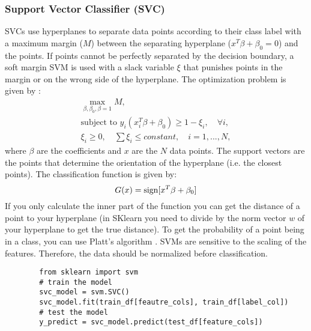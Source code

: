 \documentclass[../main.tex]{subfiles}
\begin{document}
    \subsubsection{Support Vector Classifier (SVC)}
    SVCs use hyperplanes to separate data points according to their class label with a maximum margin ($M$) between the separating hyperplane ($x^T\beta + \beta_0=0$) and the points. If points cannot be perfectly separated by the decision boundary, a soft margin SVM is used with a slack variable $\xi$ that punishes points in the margin or on the wrong side of the hyperplane.
    The optimization problem is given by \cite{Hastie2009} : 
    \begin{equation}
        \begin{split}
            \max_{\beta, \beta_0, \beta=1} M, \\
            \text{subject to } y_i(x_i^T \beta + \beta_0) \ge 1 - \xi_i, \quad \forall i, \\\xi_i \ge 0, \quad \sum \xi_i \le constant, \quad i= 1, ..., N, 
        \end{split}
    \end{equation} 
    where $\beta$ are the coefficients and $x$ are the $N$ data points. The support vectors are the points that determine the orientation of the hyperplane (i.e. the closest points).
    The classification function is given by: 
    \begin{equation}
        G(x) = \operatorname{sign}[x^T\beta + \beta_0] 
    \end{equation}
    If you only calculate the inner part of the function you can get the distance of a point to your hyperplane (in SKlearn you need to divide by the norm vector $w$ of your hyperplane to get the true distance). To get the probability of a point being in a class, you can use Platt's algorithm \cite{Platt1999}. 
    SVMs are sensitive to the scaling of the features. Therefore, the data should be normalized before classification. \\ %
    
    \begin{tcolorbox}[title=Implementation of SVCs]
        \begin{lstlisting}
        from sklearn import svm
        # train the model
        svc_model = svm.SVC()
        svc_model.fit(train_df[feautre_cols], train_df[label_col])
        # test the model
        y_predict = svc_model.predict(test_df[feature_cols])
            \end{lstlisting}
    \end{tcolorbox}



\end{document}
